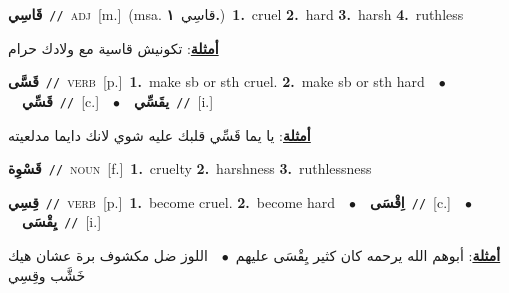\documentclass[10pt,a4paper,twoside]{article} %
\begin{document}
\begin{multicols}{2}
{\setlength\topsep{0pt}\textbf{\foreignlanguage{arabic}{قَاسِي}}\ {\color{gray}\texttt{//}\color{black}}\ \textsc{adj}\ [m.]\ \color{gray}(msa. \foreignlanguage{arabic}{قاسِي}~\foreignlanguage{arabic}{\textbf{١.}})\color{black}\ \textbf{1.}~cruel  \textbf{2.}~hard  \textbf{3.}~harsh  \textbf{4.}~ruthless\  \begin{flushright}\color{gray}\foreignlanguage{arabic}{\textbf{\underline{\foreignlanguage{arabic}{أمثلة}}}: تكونيش قاسية مع ولادك حرام}\end{flushright}\color{black}} \vspace{2mm}

{\setlength\topsep{0pt}\textbf{\foreignlanguage{arabic}{قَسَّى}}\ {\color{gray}\texttt{//}\color{black}}\ \textsc{verb}\ [p.]\ \textbf{1.}~make sb or sth cruel.  \textbf{2.}~make sb or sth hard\ \ $\bullet$\ \ \setlength\topsep{0pt}\textbf{\foreignlanguage{arabic}{قَسِّي}}\ {\color{gray}\texttt{//}\color{black}}\ [c.]\ \ $\bullet$\ \ \setlength\topsep{0pt}\textbf{\foreignlanguage{arabic}{يقَسِّي}}\ {\color{gray}\texttt{//}\color{black}}\ [i.]\  \begin{flushright}\color{gray}\foreignlanguage{arabic}{\textbf{\underline{\foreignlanguage{arabic}{أمثلة}}}: يا يما قَسِّي قلبك عليه شوي لانك دايما مدلعيته}\end{flushright}\color{black}} \vspace{2mm}

{\setlength\topsep{0pt}\textbf{\foreignlanguage{arabic}{قَسْوِة}}\ {\color{gray}\texttt{//}\color{black}}\ \textsc{noun}\ [f.]\ \textbf{1.}~cruelty  \textbf{2.}~harshness  \textbf{3.}~ruthlessness\ } \vspace{2mm}

{\setlength\topsep{0pt}\textbf{\foreignlanguage{arabic}{قِسِي}}\ {\color{gray}\texttt{//}\color{black}}\ \textsc{verb}\ [p.]\ \textbf{1.}~become cruel.  \textbf{2.}~become hard\ \ $\bullet$\ \ \setlength\topsep{0pt}\textbf{\foreignlanguage{arabic}{اِقْسَى}}\ {\color{gray}\texttt{//}\color{black}}\ [c.]\ \ $\bullet$\ \ \setlength\topsep{0pt}\textbf{\foreignlanguage{arabic}{يِقْسَى}}\ {\color{gray}\texttt{//}\color{black}}\ [i.]\  \begin{flushright}\color{gray}\foreignlanguage{arabic}{\textbf{\underline{\foreignlanguage{arabic}{أمثلة}}}: أبوهم الله يرحمه كان كثير يِقْسَى عليهم\ $\bullet$\ \  اللوز ضل مكشوف برة عشان هيك خَشَّب وقِسِي}\end{flushright}\color{black}} \vspace{2mm}


\end{multicols}
\end{document}
